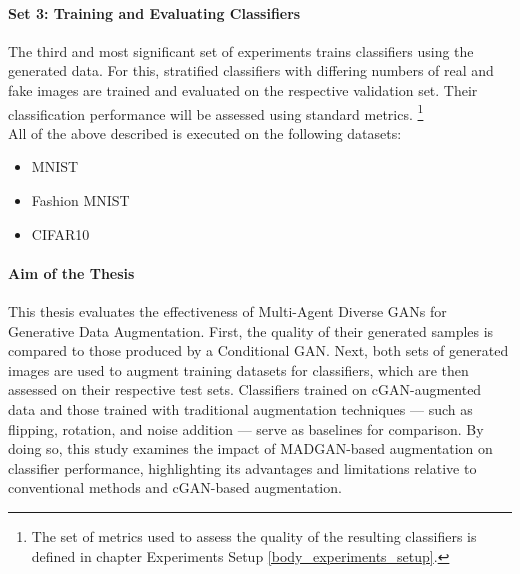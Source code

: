 \paragraph{Set 3: Training and Evaluating Classifiers}  \label{thesis_goal_3}
The third and most significant set of experiments trains classifiers using the generated data. For this, stratified classifiers with differing numbers of real and fake images are trained and evaluated on the respective validation set. Their classification performance will be assessed using standard metrics.
\footnote{The set of metrics used to assess the quality of the resulting classifiers is defined in chapter Experiments Setup \ref{body_experiments_setup}.}
\\

\noindent All of the above described is executed on the following datasets:
\begin{itemize}\label{used_datasets}
    \setlength{\itemsep}{-5pt}
    \item MNIST \cite{lecun2010mnist}
    \item Fashion MNIST \cite{xiao2017fashionmnist}
    \item CIFAR10 \cite{Krizhevsky2009learning}
\end{itemize}


\paragraph{Aim of the Thesis}\label{aim_of_the_thesis}
This thesis evaluates the effectiveness of Multi-Agent Diverse GANs for Generative Data Augmentation. First, the quality of their generated samples is compared to those produced by a Conditional GAN. Next, both sets of generated images are used to augment training datasets for classifiers, which are then assessed on their respective test sets. Classifiers trained on cGAN-augmented data and those trained with traditional augmentation techniques — such as flipping, rotation, and noise addition — serve as baselines for comparison.
By doing so, this study examines the impact of MADGAN-based augmentation on classifier performance, highlighting its advantages and limitations relative to conventional methods and cGAN-based augmentation.



\newpage
